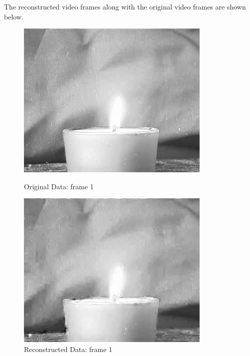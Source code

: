 \documentclass[12pt]{article}
\begin{document}
\begin{itemize}
\begin{enumerate}
    The reconstructed video frames along with the original video frames are shown below.
    \begin{figure}[H]
        \centering
        \begin{minipage}{.45\textwidth}
            \centering
            \includegraphics[width=\linewidth]{results/flame_5_orig_1.png}
            \caption*{Original Data: frame 1}
        \end{minipage}
        \begin{minipage}{.45\textwidth}
            \centering
            \includegraphics[width=\linewidth]{results/flame_5_recon_1.png}
            \caption*{Reconstructed Data: frame 1}
        \end{minipage}
    \end{figure}


\end{enumerate}
\end{itemize}
\end{document}
